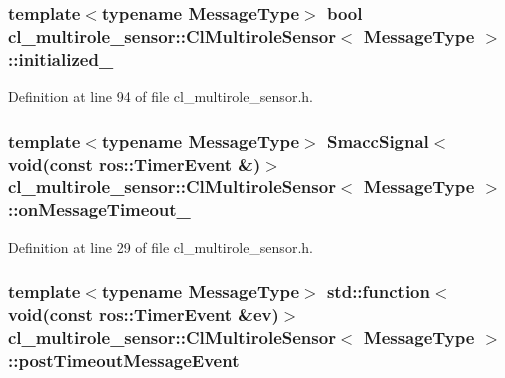 \subsubsection[{\texorpdfstring{initialized\+\_\+}{initialized_}}]{\setlength{\rightskip}{0pt plus 5cm}template$<$typename Message\+Type$>$ {\bf bool} {\bf cl\+\_\+multirole\+\_\+sensor\+::\+Cl\+Multirole\+Sensor}$<$ Message\+Type $>$\+::initialized\+\_\+\hspace{0.3cm}{\ttfamily [private]}}\hypertarget{classcl__multirole__sensor_1_1ClMultiroleSensor_a1f2bbfd7721308cb1eae4423d5fe999b}{}\label{classcl__multirole__sensor_1_1ClMultiroleSensor_a1f2bbfd7721308cb1eae4423d5fe999b}


Definition at line 94 of file cl\+\_\+multirole\+\_\+sensor.\+h.

\subsubsection[{\texorpdfstring{on\+Message\+Timeout\+\_\+}{onMessageTimeout_}}]{\setlength{\rightskip}{0pt plus 5cm}template$<$typename Message\+Type$>$ {\bf Smacc\+Signal}$<$void(const ros\+::\+Timer\+Event \&)$>$ {\bf cl\+\_\+multirole\+\_\+sensor\+::\+Cl\+Multirole\+Sensor}$<$ Message\+Type $>$\+::on\+Message\+Timeout\+\_\+}\hypertarget{classcl__multirole__sensor_1_1ClMultiroleSensor_afd37257b949c421d4f579b47352be95f}{}\label{classcl__multirole__sensor_1_1ClMultiroleSensor_afd37257b949c421d4f579b47352be95f}


Definition at line 29 of file cl\+\_\+multirole\+\_\+sensor.\+h.

\subsubsection[{\texorpdfstring{post\+Timeout\+Message\+Event}{postTimeoutMessageEvent}}]{\setlength{\rightskip}{0pt plus 5cm}template$<$typename Message\+Type$>$ std\+::function$<$void(const ros\+::\+Timer\+Event \&ev)$>$ {\bf cl\+\_\+multirole\+\_\+sensor\+::\+Cl\+Multirole\+Sensor}$<$ Message\+Type $>$\+::post\+Timeout\+Message\+Event}\hypertarget{classcl__multirole__sensor_1_1ClMultiroleSensor_a61a6e5dce7f1b34508701a8bc8f06ab9}{}\label{classcl__multirole__sensor_1_1ClMultiroleSensor_a61a6e5dce7f1b34508701a8bc8f06ab9}


